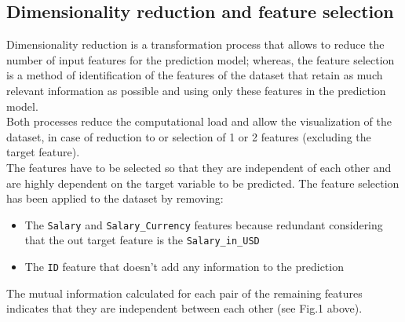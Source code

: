 \documentclass[11pt,a4paper]{article}
\begin{document}
\subsection{Dimensionality reduction and feature selection} 
Dimensionality reduction is a transformation process that allows to reduce the number of input features for the prediction model; whereas, the feature selection is a method of identification of the features of the dataset that retain as much relevant information as possible and using only these features in the prediction model.
\\
Both processes reduce the computational load and allow the visualization of the dataset, in case of reduction to or selection of 1 or 2 features (excluding the target feature).
\\
The features have to be selected so that they are independent of each other and are highly dependent on the target variable to be predicted.
The feature selection has been applied to the dataset by removing:

\begin{itemize}
\item The \texttt{Salary} and \texttt{Salary\_Currency} features because redundant considering that the out target feature is the \texttt{Salary\_in\_USD} 
\item The \texttt{ID} feature that doesn’t add any information to the prediction
\end{itemize}

The mutual information calculated for each pair of the remaining features indicates that they are independent between each other (see Fig.1 above).
\end{document}
